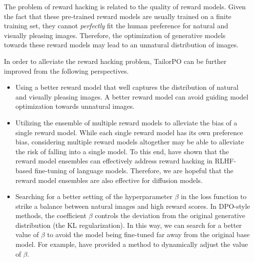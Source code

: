 The problem of reward hacking is related to the quality of reward models. Given the fact that these pre-trained reward models are usually trained on a finite training set, they cannot \textit{perfectly} fit the human preference for natural and visually pleasing images. Therefore, the optimization of generative models towards these reward models may lead to an unnatural distribution of images.

In order to alleviate the reward hacking problem, TailorPO can be further improved from the following perspectives.

\begin{itemize}
    \item Using a better reward model that well captures the distribution of natural and visually pleasing images. A better reward model can avoid guiding model optimization towards unnatural images.
    \item Utilizing the ensemble of multiple reward models to alleviate the bias of a single reward model. While each single reward model has its own preference bias, considering multiple reward models altogether may be able to alleviate the risk of falling into a single model. To this end, \citet{coste24reward} have shown that the reward model ensembles can effectively address reward hacking in RLHF-based fine-tuning of language models. Therefore, we are hopeful that the reward model ensembles are also effective for diffusion models.
    \item Searching for a better setting of the hyperparameter $\beta$ in the loss function to strike a balance between natural images and high reward scores. In DPO-style methods, the coefficient $\beta$ controls the deviation from the original generative distribution (the KL regularization). In this way, we can search for a better value of $\beta$ to avoid the model being fine-tuned far away from the original base model. For example, \citet{wu24beta} have provided a method to dynamically adjust the value of $\beta$.
\end{itemize}

